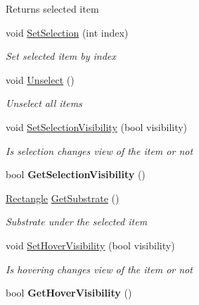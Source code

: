 \begin{DoxyCompactItemize}
\begin{DoxyCompactList}
\begin{DoxyReturn}{Returns}
selected item 
\end{DoxyReturn}
\end{DoxyCompactList}\item 
void \mbox{\hyperlink{class_space_v_i_l_1_1_list_area_a4a0e42a96f357bf2f0c58731ade71ffd}{Set\+Selection}} (int index)
\begin{DoxyCompactList}\small\item\em Set selected item by index \end{DoxyCompactList}\item 
void \mbox{\hyperlink{class_space_v_i_l_1_1_list_area_ac7ed057dd6d34a265aaacca971c61b2b}{Unselect}} ()
\begin{DoxyCompactList}\small\item\em Unselect all items \end{DoxyCompactList}\item 
void \mbox{\hyperlink{class_space_v_i_l_1_1_list_area_afb9baa1b6b71d8223b3b2b86ed95dce1}{Set\+Selection\+Visibility}} (bool visibility)
\begin{DoxyCompactList}\small\item\em Is selection changes view of the item or not \end{DoxyCompactList}\item 
\mbox{\label{class_space_v_i_l_1_1_list_area_ae8372a3bdb6cfd42b0ecd3f5deb3bbf6}} 
bool {\bfseries Get\+Selection\+Visibility} ()
\item 
\mbox{\hyperlink{class_space_v_i_l_1_1_rectangle}{Rectangle}} \mbox{\hyperlink{class_space_v_i_l_1_1_list_area_a204ed17573d7651514702422b51f1389}{Get\+Substrate}} ()
\begin{DoxyCompactList}\small\item\em Substrate under the selected item \end{DoxyCompactList}\item 
void \mbox{\hyperlink{class_space_v_i_l_1_1_list_area_ab4a8ef41e41ece5524e49a0244f5fd21}{Set\+Hover\+Visibility}} (bool visibility)
\begin{DoxyCompactList}\small\item\em Is hovering changes view of the item or not \end{DoxyCompactList}\item 
\mbox{\label{class_space_v_i_l_1_1_list_area_a968022f6d0c8ec10b48fe4aa2e5561fd}} 
bool {\bfseries Get\+Hover\+Visibility} ()
\item 

\end{DoxyCompactItemize}
